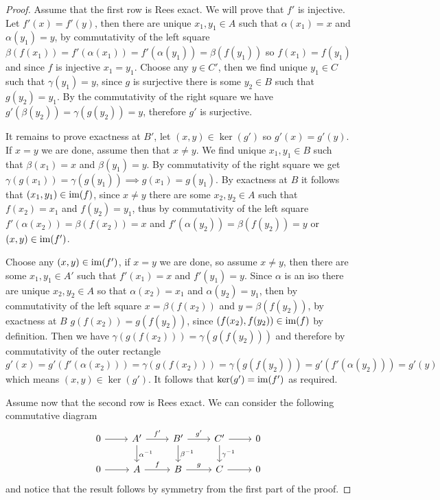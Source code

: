 \begin{proof}[Proof]
    \par Assume that the first row is Rees exact. We will prove that 
    $f'$ is injective. Let $f'(x)=f'(y)$, then there are unique 
    $x_1,y_1\in A$ such that $\alpha(x_1) = x$ and $\alpha(y_1) = y$, 
    by commutativity of the left square $\beta(f(x_1))=f'(\alpha(x_1))=f'(\alpha(y_1))=\beta(f(y_1))$ so 
    $f(x_1)=f(y_1)$ and since $f$ is injective $x_1=y_1$. Choose any $y\in C'$,
    then we find unique $y_1\in C$ such that $\gamma(y_1) = y$, since $g$ is surjective
    there is some $y_2\in B$ such that $g(y_2) = y_1$. By the commutativity of the right square
    we have $g'(\beta(y_2)) = \gamma(g(y_2)) = y$, therefore $g'$ is surjective.
    \par It remains to prove exactness at $B'$, let $(x,y)\in\ker(g')$ so $g'(x)=g'(y)$. 
    If $x=y$ we are done, assume then that $x\neq y$. We find unique $x_1,y_1\in B$ such that 
    $\beta(x_1) = x$ and $\beta(y_1) = y$. By commutativity of the right square we get
    $\gamma(g(x_1)) = \gamma(g(y_1)) \implies g(x_1)=g(y_1)$. By exactness at $B$ 
    it follows that $(x_1,y_1)\in\text{im}(f)$, since $x\neq y$ there are some 
    $x_2,y_2\in A$ such that $f(x_2)=x_1$ and $f(y_2)=y_1$, thus 
    by commutativity of the left square $f'(\alpha(x_2)) = \beta(f(x_2)) = x$ 
    and $f'(\alpha(y_2)) = \beta(f(y_2)) = y$ or $(x,y)\in\text{im}(f')$.
    \par Choose any $(x,y)\in\text{im}(f')$, if $x=y$ we are done, so assume $x\neq y$,
    then there are some $x_1,y_1\in A'$ such that $f'(x_1)=x$ and $f'(y_1)=y$. 
    Since $\alpha$ is an iso there are unique $x_2,y_2\in A$ so that 
    $\alpha(x_2)=x_1$ and $\alpha(y_2)=y_1$, then by commutativity of the 
    left square $x = \beta(f(x_2))$ and $y=\beta(f(y_2))$, by exactness at $B$
    $g(f(x_2))=g(f(y_2))$, since $(f(x_2),f(y_2))\in\text{im}(f)$ by definition.
    Then we have $\gamma(g(f(x_2))) = \gamma(g(f(y_2)))$ and therefore 
    by commutativity of the outer rectangle 
    $g'(x) = g'(f'(\alpha(x_2))) = \gamma(g(f(x_2))) = \gamma(g(f(y_2))) = g'(f'(\alpha(y_2))) = g'(y)$
    which means $(x,y)\in\ker(g')$. It follows that $\ker(g') = \text{im}(f')$ as 
    required.
    \par Assume now that the second row is Rees exact. We can consider the following 
    commutative diagram 
    \[\begin{tikzcd}
        0 & {A'} & {B'} & {C'} & 0 \\
        0 & A & B & C & 0
        \arrow[from=1-1, to=1-2]
        \arrow["{f'}", from=1-2, to=1-3]
        \arrow["{\alpha^{-1}}", from=1-2, to=2-2]
        \arrow["{g'}", from=1-3, to=1-4]
        \arrow["{\beta^{-1}}", from=1-3, to=2-3]
        \arrow[from=1-4, to=1-5]
        \arrow["{\gamma^{-1}}", from=1-4, to=2-4]
        \arrow[from=2-1, to=2-2]
        \arrow["f", from=2-2, to=2-3]
        \arrow["g", from=2-3, to=2-4]
    	\arrow[from=2-4, to=2-5]
    \end{tikzcd}\]
    and notice that the result follows by symmetry from the first part of the proof. 
\end{proof}

